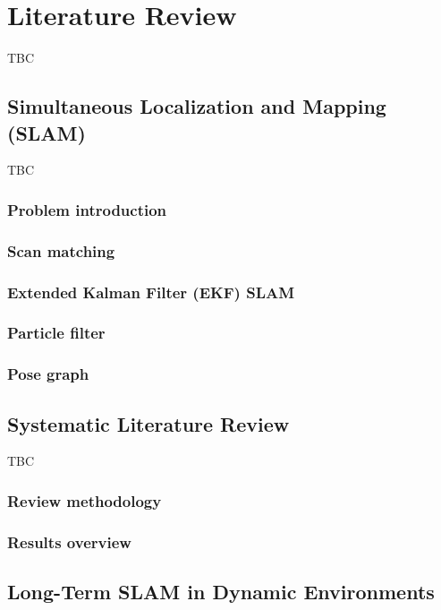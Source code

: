 \chapter{Literature Review}\label{chap:literature}

TBC

\section{Simultaneous Localization and Mapping (SLAM)}\label{sec:literature:slam}

TBC

\subsection{Problem introduction}
\subsection{Scan matching}
\subsection{Extended Kalman Filter (EKF) SLAM}
\subsection{Particle filter}
\subsection{Pose graph}

\section{Systematic Literature Review}\label{sec:literature:systematic}

TBC

\subsection{Review methodology}
\subsection{Results overview}

\section{Long-Term SLAM in Dynamic Environments}\label{sec:literature:dynamic}

